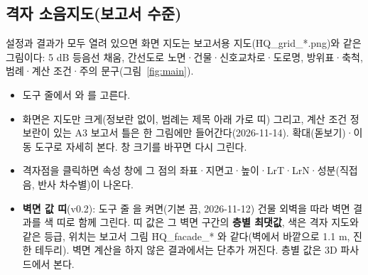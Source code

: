 \documentclass[10.5pt,a4paper]{article}
\begin{document}
\subsection{격자 소음지도(보고서 수준)}
설정과 결과가 모두 열려 있으면 화면 지도는 보고서용 지도(\f{HQ\_grid\_*.png})와 같은 그림이다: 5 dB 등음선 채움, 간선도로 노면·건물·신호교차로·도로명, 방위표·축척, 범례·계산 조건·주의 문구(그림~\ref{fig:main}).
\begin{itemize}
\item 도구 줄에서 와 를 고른다.
\item 화면은 지도만 크게(정보란 없이, 범례는 제목 아래 가로 띠) 그리고, 계산 조건 정보란이 있는 A3 보고서 틀은 한 그림에만 들어간다(2026-11-14). 확대(돋보기)·이동 도구로 자세히 본다. 창 크기를 바꾸면 다시 그린다.
\item 격자점을 클릭하면 속성 창에 그 점의 좌표·지면고·높이·LrT·LrN·성분(직접음, 반사 차수별)이 나온다.
\item \textbf{벽면 값 띠}(v0.2): 도구 줄 을 켜면(기본 끔, 2026-11-12) 건물 외벽을 따라 벽면 결과를 색 띠로 함께 그린다. 띠 값은 그 벽면 구간의 \textbf{층별 최댓값}, 색은 격자 지도와 같은 등급, 위치는 보고서 그림 \f{HQ\_facade\_*} 와 같다(벽에서 바깥으로 1.1 m, 진한 테두리). 벽면 계산을 하지 않은 결과에서는 단추가 꺼진다. 층별 값은 3D 파사드에서 본다.
\end{itemize}
\end{document}
